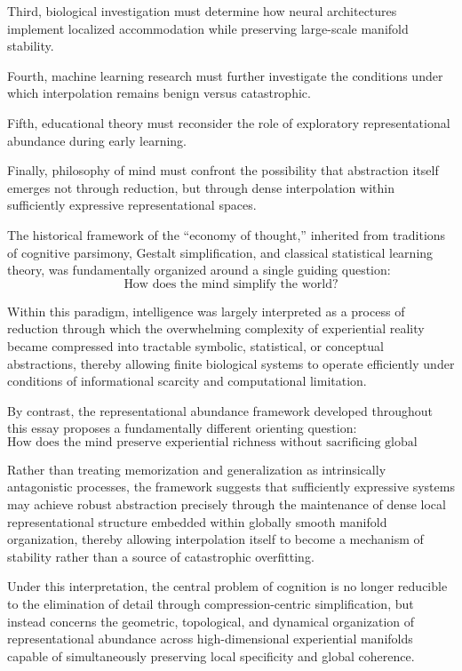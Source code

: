 \documentclass[12pt,a4paper]{article}
\begin{document}
Third, biological investigation must determine how neural architectures implement localized accommodation while preserving large-scale manifold stability.

Fourth, machine learning research must further investigate the conditions under which interpolation remains benign versus catastrophic.

Fifth, educational theory must reconsider the role of exploratory representational abundance during early learning.

Finally, philosophy of mind must confront the possibility that abstraction itself emerges not through reduction, but through dense interpolation within sufficiently expressive representational spaces.

The historical framework of the ``economy of thought,'' inherited from traditions of cognitive parsimony, Gestalt simplification, and classical statistical learning theory, was fundamentally organized around a single guiding question:
\[
\text{How does the mind simplify the world?}
\]

Within this paradigm, intelligence was largely interpreted as a process of reduction through which the overwhelming complexity of experiential reality became compressed into tractable symbolic, statistical, or conceptual abstractions, thereby allowing finite biological systems to operate efficiently under conditions of informational scarcity and computational limitation.

By contrast, the representational abundance framework developed throughout this essay proposes a fundamentally different orienting question:
\[
\text{How does the mind preserve experiential richness without sacrificing global stability?}
\]

Rather than treating memorization and generalization as intrinsically antagonistic processes, the framework suggests that sufficiently expressive systems may achieve robust abstraction precisely through the maintenance of dense local representational structure embedded within globally smooth manifold organization, thereby allowing interpolation itself to become a mechanism of stability rather than a source of catastrophic overfitting.

Under this interpretation, the central problem of cognition is no longer reducible to the elimination of detail through compression-centric simplification, but instead concerns the geometric, topological, and dynamical organization of representational abundance across high-dimensional experiential manifolds capable of simultaneously preserving local specificity and global coherence.
\end{document}
